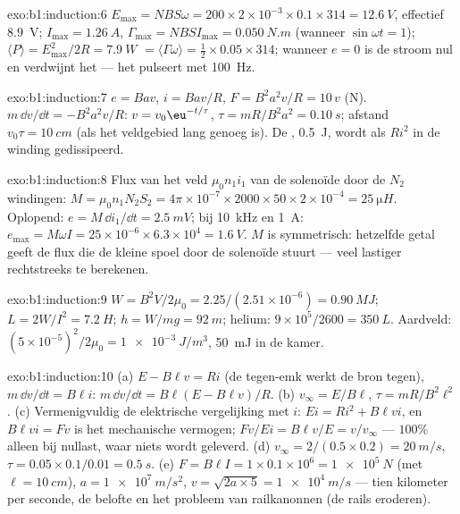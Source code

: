 \begin{solution}{exo:b1:induction:6}
$E_{\max} = NBS\omega = 200 \times 2 \times 10^{-3} \times 0.1 \times 314 = \qty{12.6}{V}$, effectief
\qty{8.9}{V}; $I_{\max} = \qty{1.26}{A}$, $\Gamma_{\max} = NBSI_{\max} = \qty{0.050}{N.m}$
(wanneer $\sin\omega t = 1$); $\langle P\rangle = E_{\max}^2/2R = \qty{7.9}{W}$ $=
\langle\Gamma\omega\rangle = \tfrac12 \times 0.05 \times 314$; wanneer $e = 0$ is de stroom
nul en verdwijnt het  --- het  pulseert met \qty{100}{Hz}.
\end{solution}

\begin{solution}{exo:b1:induction:7}
$e = Bav$, $i = Bav/R$, $F = B^2a^2v/R = 10\,v$ (N). $m\,\dd v/\dd t = -B^2a^2v/R$:
$v = v_0\eu^{-t/\tau}$, $\tau = mR/B^2a^2 = \qty{0.10}{s}$; afstand $v_0\tau =
\qty{10}{cm}$ (als het veldgebied lang genoeg is). De ,
\qty{0.5}{J}, wordt als $Ri^2$ in de winding gedissipeerd.
\end{solution}

\begin{solution}{exo:b1:induction:8}
Flux van het veld $\mu_0n_1i_1$ van de solenoïde door de $N_2$ windingen: $M =
\mu_0n_1N_2S_2 = 4\pi \times 10^{-7} \times 2000 \times 50 \times 2 \times 10^{-4} = \qty{25}{\micro H}$.
Oplopend: $e = M\,\dd i_1/\dd t = \qty{2.5}{mV}$; bij \qty{10}{kHz} en \qty{1}{A}: $e_{\max} =
M\omega I = 25 \times 10^{-6} \times 6.3 \times 10^4 = \qty{1.6}{V}$. $M$ is symmetrisch:
hetzelfde getal geeft de flux die de kleine spoel door de
solenoïde stuurt --- veel lastiger rechtstreeks te berekenen.
\end{solution}

\begin{solution}{exo:b1:induction:9}
$W = B^2V/2\mu_0 = 2.25/(2.51 \times 10^{-6}) = \qty{0.90}{MJ}$; $L = 2W/I^2 =
\qty{7.2}{H}$; $h = W/mg = \qty{92}{m}$; helium: $9 \times 10^5/2600 = \qty{350}{L}$.
Aardveld: $(5 \times 10^{-5})^2/2\mu_0 = \qty{1e-3}{J/m^3}$, \qty{50}{mJ} in
de kamer.
\end{solution}

\begin{solution}{exo:b1:induction:10}
(a) $E - B\ell v = Ri$ (de tegen-emk werkt de bron tegen), $m\,\dd v/\dd t =
B\ell i$: $m\,\dd v/\dd t = B\ell(E - B\ell v)/R$. (b) $v_\infty = E/B\ell$, $\tau =
mR/B^2\ell^2$. (c) Vermenigvuldig de elektrische vergelijking met $i$: $Ei = Ri^2 +
B\ell vi$, en $B\ell vi = Fv$ is het mechanische vermogen;  $Fv/Ei =
B\ell v/E = v/v_\infty$ --- $100\%$ alleen bij nullast, waar niets wordt
geleverd. (d) $v_\infty = 2/(0.5 \times 0.2) = \qty{20}{m/s}$, $\tau = 0.05 \times
0.1/0.01 = \qty{0.5}{s}$. (e) $F = B\ell I = 1 \times 0.1 \times 10^6 = \qty{1e5}{N}$
(met $\ell = \qty{10}{cm}$), $a = \qty{1e7}{m/s^2}$, $v = \sqrt{2a \times 5} =
\qty{1e4}{m/s}$ --- tien kilometer per seconde, de belofte en het
probleem van railkanonnen (de rails eroderen).
\end{solution}

